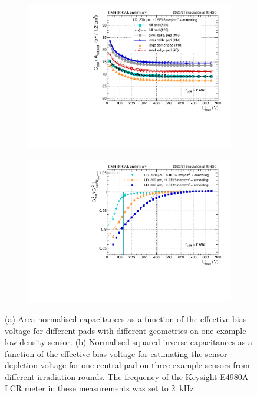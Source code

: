 \begin{figure}
	\captionsetup[subfigure]{aboveskip=-1pt,belowskip=-1pt}
	\centering
	\begin{subfigure}[b]{0.49\textwidth}
		\includegraphics[width=0.999\textwidth]{plots/channel_cv/channel_CV_sensors_channels.pdf}
		\subcaption{
		}
		\label{plot:pad_CV_channels}
	\end{subfigure}
	\hfill
	\begin{subfigure}[b]{0.49\textwidth}
		\includegraphics[width=0.999\textwidth]{plots/channel_cv/channel_invCV_sensors_sensors.pdf}
		\subcaption{
		}
		\label{plot:pad_invCV_sensor}
	\end{subfigure}
	\caption{
		(a) Area-normalised capacitances as a function of the effective bias voltage for different pads with different geometries on one example low density sensor.
		(b) Normalised squared-inverse capacitances as a function of the effective bias voltage for estimating the sensor depletion voltage for one central pad on three example sensors from different irradiation rounds.
		The frequency of the Keysight E4980A LCR meter in these measurements was set to \SI{2}{\kilo\hertz}.
	}
\end{figure}
